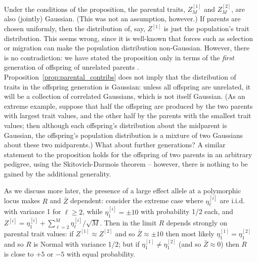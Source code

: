 \documentclass{article}
\newcommand{\1}{\mathbbm{1}}
\theoremstyle{remark}
\theoremstyle{definition}
\begin{document}
Under the conditions of the proposition, 
the parental traits, $Z^{[1]}_M$ and $Z^{[2]}_M$,
are also (jointly) Gaussian.
(This was not an assumption, however.)
If parents are chosen uniformly, then
the distribution of, say, $Z^{[1]}$ is just the population's trait distribution.
This seems wrong, since it is well-known that forces such as selection or migration
can make the population distribution non-Gaussian.
However, there is no contradiction:
we have stated the proposition only in terms of the \emph{first} generation
of offspring of unrelated parents \citep[as in][]{barton2017infinitesimal}.
Proposition~\ref{prop:parental_contribs} does not imply that
the distribution of traits in the offspring generation is Gaussian:
unless all offspring are unrelated,
it will be a collection of correlated Gaussians,
which is not itself Gaussian.
(As an extreme example, suppose that half the offspring are produced by the two parents
with largest trait values, and the other half by the parents with the smallest trait values;
then although each offspring's distribution about the midparent is Gaussian,
the offspring's population distribution is a mixture of two Gaussians
about these two midparents.)
What about further generations?
A similar statement to the proposition
holds for the offspring of two parents in an arbitrary pedigree,
using the Skitovich-Darmois theorem \citet{kagan1973characterization}
-- however, there is nothing to be gained by the additional generality.

As we discuss more later,
the presence of a large effect allele at a polymorphic locus 
makes $R$ and $\bar Z$ dependent:
consider the extreme case where $\eta^{[i]}_\ell$ are i.i.d.{} with variance 1 for $\ell \ge 2$,
while $\eta^{[i]}_1 = \pm 10$ with probability 1/2 each,
and $Z^{[i]} = \eta_1^{[i]} + \sum_{\ell=2}^M \eta_\ell^{[i]} / \sqrt{M}$.
Then in the limit $R$ depends strongly on parental trait values:
if $Z^{[1]} \approx Z^{[2]}$ and so $\bar Z \approx \pm 10$ then most likely
$\eta_1^{[1]} = \eta_1^{[2]}$ and so $R$ is Normal with variance 1/2;
but if $\eta_1^{[1]} \neq \eta_1^{[2]}$ (and so $\bar Z \approx 0$)
then $R$ is close to $+5$ or $-5$ with equal probability.

\end{document}
